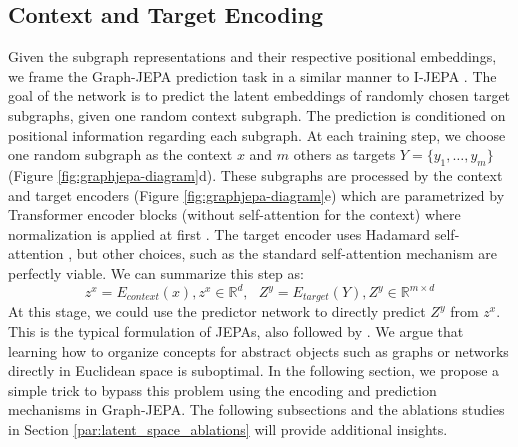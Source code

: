 \documentclass{article} \usepackage{iclr2024_conference,times}
\begin{document}
\subsection{Context and Target Encoding} \label{met:context_target}
Given the subgraph representations and their respective positional embeddings, we frame the Graph-JEPA prediction task in a similar manner to I-JEPA \citep{assran2023self}. The goal of the network is to predict the latent embeddings of randomly chosen target subgraphs, given one random context subgraph. The prediction is conditioned on positional information regarding each subgraph. At each training step, we choose one random subgraph as the context $x$ and $m$ others as targets $Y = \{y_1, \ldots, y_m\}$ (Figure \ref{fig:graphjepa-diagram}d). These subgraphs are processed by the context and target encoders (Figure \ref{fig:graphjepa-diagram}e) which are parametrized by Transformer encoder blocks (without self-attention for the context) where normalization is applied at first \citep{xiong2020layer}. The target encoder uses Hadamard self-attention \citep{he2023generalization}, but other choices, such as the standard self-attention mechanism \citep{vaswani2017attention} are perfectly viable. We can summarize this step as:
\begin{equation}
    z^x = E_{context}(x), z^x \in \mathbb{R}^d, ~~~Z^y = E_{target}(Y), Z^y  \in \mathbb{R}^{m \times d}
\end{equation}
At this stage, we could use the predictor network to directly predict $Z^y$ from $z^x$. This is the typical formulation of JEPAs, also followed by \citet{assran2023self}. We argue that learning how to organize concepts for abstract objects such as graphs or networks directly in Euclidean space is suboptimal. In the following section, we propose a simple trick to bypass this problem using the encoding and prediction mechanisms in Graph-JEPA. The following subsections and the ablations studies in Section \ref{par:latent_space_ablations} will provide additional insights.
\end{document}
